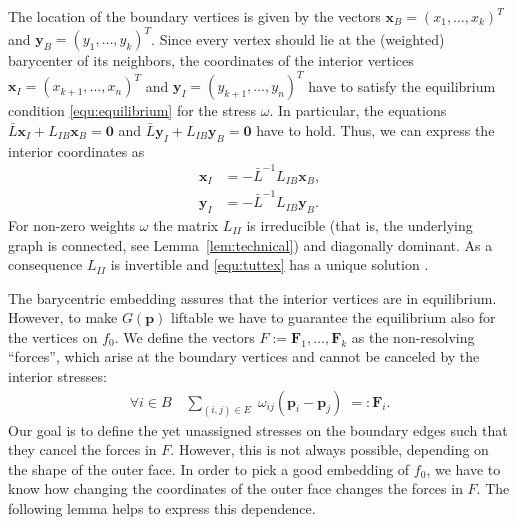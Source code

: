\documentclass{article}
\theoremstyle{plain} \newtheorem{thm}{Theorem}[section]
\newcommand{\p}{\mathbf{p}}
\begin{document}
The location of the boundary vertices is given by the vectors 
$\mathbf{x}_B=(x_1,\ldots,x_k)^T$ and  $\mathbf{y}_B=(y_1,\ldots,y_k)^T$.
Since every vertex should lie at the (weighted) barycenter of its neighbors, the coordinates of the interior vertices   $\mathbf{x}_I=(x_{k+1},\ldots,x_n)^T$ and
  $\mathbf{y}_I=(y_{k+1},\ldots,y_n)^T$ have to satisfy the  equilibrium condition
\eqref{equ:equilibrium} for the stress $\omega$. In particular, 
the equations $\bar L \mathbf{x}_I + L_{IB}\mathbf{x}_B=\mathbf{0}$ and  $\bar L \mathbf{y}_I + L_{IB}\mathbf{y}_B=\mathbf{0}$ have to hold. 
Thus, we can express the interior coordinates as
\begin{equation}\label{equ:tuttex}
\begin{split}
  \mathbf{x}_I&=-\bar{L}^{-1}L_{IB}\mathbf{x}_B,\\
  \mathbf{y}_I&=-\bar{L}^{-1}L_{IB}\mathbf{y}_B.
\end{split}
\end{equation}
For non-zero weights $\omega$ the matrix $L_{II}$ is irreducible (that is, the underlying graph is connected, see Lemma~\ref{lem:technical}) and diagonally dominant. As a consequence $L_{II}$ is invertible and \eqref{equ:tuttex} has a unique solution \cite[page 363]{hj-ma-90}.

The barycentric embedding assures that the interior vertices are in equilibrium. However, to make $G(\p)$ liftable we have to guarantee the equilibrium also for the vertices on $f_0$. 
We define the vectors
$F:=\mathbf{F}_1,\ldots,\mathbf{F}_k$
as the non-resolving ``forces'', which arise at the boundary vertices and
cannot be canceled by the interior stresses:
\begin{align}\label{equ:nonresolve}
\forall i\in B \quad \sum_{(i,j) \in E } \; \omega_{ij}(\p_i-\p_j) \;
=: \mathbf{F}_i.
\end{align}
Our goal is to define the yet unassigned stresses on the boundary
edges such that they cancel the forces in $F$.  However, this is not
always possible, depending on the shape of the outer face.
In order to pick a good embedding of $f_0$, we have to know how
changing the coordinates of the outer face changes the forces in $F$.
The following lemma helps to express this dependence.

 
\end{document}

